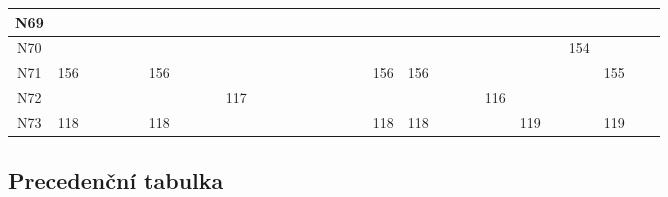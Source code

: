 \documentclass[11pt,a4paper]{article}
\begin{document}
\begin{lrbox}{\lltablebox}
\begin{tabular}{|*{31}{c|}}
N69 &  &  &  &  &  &  &  &  &  &  &  &  &  &  &  &  &  &  &  &  &  &  &  &  &  &  &  &  &  &  \\ \hline
N70 &  &  &  &  &  &  &  &  &  &  &  &  &  &  &  &  &  &  &  &  &  &  &  &  &  &  & 154 &  &  &  \\ \hline
N71 & 156 &  &  &  &  & 156 &  &  &  &  &  &  &  &  &  &  &  &  & 156 & 156 &  &  &  &  &  &  &  & 155 &  &  \\ \hline
N72 &  &  &  &  &  &  &  &  &  & 117 &  &  &  &  &  &  &  &  &  &  &  &  &  & 116 &  &  &  &  &  &  \\ \hline
N73 & 118 &  &  &  &  & 118 &  &  &  &  &  &  &  &  &  &  &  &  & 118 & 118 &  &  &  &  & 119 &  &  & 119 &  &  \\ \hline
\end{tabular}
\end{lrbox}
\noindent
\ifdim\wd\lltablebox>\linewidth
  \resizebox{\linewidth}{!}{\usebox{\lltablebox}}%
\else
  \usebox{\lltablebox}%
\fi\par
\endgroup
\restoregeometry

\subsection{Precedenční tabulka}
\end{document}

